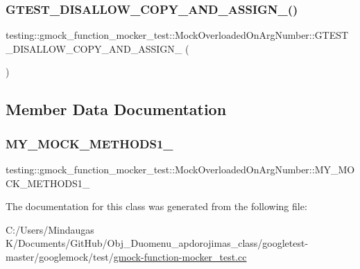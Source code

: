 \subsubsection{\texorpdfstring{GTEST\_DISALLOW\_COPY\_AND\_ASSIGN\_()}{GTEST\_DISALLOW\_COPY\_AND\_ASSIGN\_()}\hspace{0.1cm}{\footnotesize\ttfamily [2/2]}}
{\footnotesize\ttfamily testing\+::gmock\+\_\+function\+\_\+mocker\+\_\+test\+::\+Mock\+Overloaded\+On\+Arg\+Number\+::\+G\+T\+E\+S\+T\+\_\+\+D\+I\+S\+A\+L\+L\+O\+W\+\_\+\+C\+O\+P\+Y\+\_\+\+A\+N\+D\+\_\+\+A\+S\+S\+I\+G\+N\+\_\+ (\begin{DoxyParamCaption}\item[{\mbox{\hyperlink{classtesting_1_1gmock__function__mocker__test_1_1_mock_overloaded_on_arg_number}{Mock\+Overloaded\+On\+Arg\+Number}}}]{ }\end{DoxyParamCaption})\hspace{0.3cm}{\ttfamily [private]}}



\subsection{Member Data Documentation}
\mbox{\label{classtesting_1_1gmock__function__mocker__test_1_1_mock_overloaded_on_arg_number_a251bfa5d95ae7a52ccfc9b541fac2ea5}} 
\subsubsection{\texorpdfstring{MY\_MOCK\_METHODS1\_}{MY\_MOCK\_METHODS1\_}}
{\footnotesize\ttfamily testing\+::gmock\+\_\+function\+\_\+mocker\+\_\+test\+::\+Mock\+Overloaded\+On\+Arg\+Number\+::\+M\+Y\+\_\+\+M\+O\+C\+K\+\_\+\+M\+E\+T\+H\+O\+D\+S1\+\_\+}



The documentation for this class was generated from the following file\+:\begin{DoxyCompactItemize}
\item 
C\+:/\+Users/\+Mindaugas K/\+Documents/\+Git\+Hub/\+Obj\+\_\+\+Duomenu\+\_\+apdorojimas\+\_\+class/googletest-\/master/googlemock/test/\mbox{\hyperlink{googletest-master_2googlemock_2test_2gmock-function-mocker__test_8cc}{gmock-\/function-\/mocker\+\_\+test.\+cc}}\end{DoxyCompactItemize}
